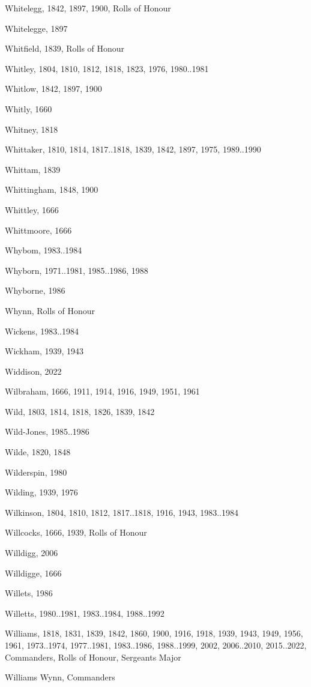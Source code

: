 {\begin{theindex}
\item Whitelegg, 1842, 1897, 1900, Rolls of Honour
\item Whitelegge, 1897
\item Whitfield, 1839, Rolls of Honour
\item Whitley, 1804, 1810, 1812, 1818, 1823, 1976, 1980..1981
\item Whitlow, 1842, 1897, 1900
\item Whitly, 1660
\item Whitney, 1818
\item Whittaker, 1810, 1814, 1817..1818, 1839, 1842, 1897, 1975, 1989..1990
\item Whittam, 1839
\item Whittingham, 1848, 1900
\item Whittley, 1666
\item Whittmoore, 1666
\item Whybom, 1983..1984
\item Whyborn, 1971..1981, 1985..1986, 1988
\item Whyborne, 1986
\item Whynn, Rolls of Honour
\item Wickens, 1983..1984
\item Wickham, 1939, 1943
\item Widdison, 2022
\item Wilbraham, 1666, 1911, 1914, 1916, 1949, 1951, 1961
\item Wild, 1803, 1814, 1818, 1826, 1839, 1842
\item Wild-Jones, 1985..1986
\item Wilde, 1820, 1848
\item Wilderspin, 1980
\item Wilding, 1939, 1976
\item Wilkinson, 1804, 1810, 1812, 1817..1818, 1916, 1943, 1983..1984
\item Willcocks, 1666, 1939, Rolls of Honour
\item Willdigg, 2006
\item Willdigge, 1666
\item Willets, 1986
\item Willetts, 1980..1981, 1983..1984, 1988..1992
\item Williams, 1818, 1831, 1839, 1842, 1860, 1900, 1916, 1918, 1939, 1943, 1949, 1956, 1961, 1973..1974, 1977..1981, 1983..1986, 1988..1999, 2002, 2006..2010, 2015..2022, Commanders, Rolls of Honour, Sergeants Major
\item Williams Wynn, Commanders

\end{theindex}}
